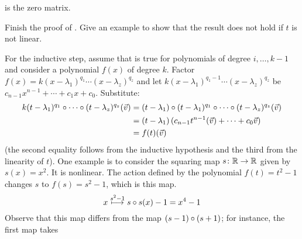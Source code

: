 \begin{exercises}
\begin{answer}
\begin{exparts}
\begin{equation*}
         \end{equation*}
         is the zero matrix.
       \end{exparts} 
     \end{answer}
   \recommended \item \label{exer:PolyMapsFactor}
      \begin{exparts}
        \partsitem Finish the proof of .
        \partsitem Give an example to show that the result does not hold
          if $t$ is not linear.
      \end{exparts}
      \begin{answer}
        \begin{exparts}
          \partsitem
            For the inductive step, assume that 
            is true for polynomials
            of degree \( i,\ldots,k-1 \) and consider a polynomial \( f(x) \)
            of degree \( k \). 
            Factor $f(x)=k(x-\lambda_1)^{q_1}\cdots(x-\lambda_z)^{q_z}$
            and let
            \( k(x-\lambda_1)^{q_1-1}\cdots(x-\lambda_z)^{q_z} \)
            be \( c_{n-1}x^{n-1}+\cdots+c_1x+c_0 \).
            Substitute:
            \begin{align*}
               k(t-\lambda_1)^{q_1}\mathbin{\circ} \cdots\mathbin{\circ} 
                                            (t-\lambda_z)^{q_z}(\vec{v})
               &=
               (t-\lambda_1)\mathbin{\circ} 
                  (t-\lambda_1)^{q_1}\mathbin{\circ} \cdots\mathbin{\circ} 
                  (t-\lambda_z)^{q_z}
                          (\vec{v})    \\
               &=
               (t-\lambda_1)\,(c_{n-1}t^{n-1}(\vec{v})+\cdots+c_0\vec{v}) \\
               &=
               f(t)(\vec{v})
            \end{align*}
           (the second equality follows from the inductive hypothesis and 
           the third from the linearity of \( t \)).
         \partsitem One example is to consider the squaring map
            $\mbox{$s\colon \mathbb{R}\to \mathbb{R}$}$ given by $s(x)=x^2$.
            It is nonlinear.
            The action defined by the polynomial $f(t)=t^2-1$ 
            changes $s$ to $f(s)=s^2-1$, which is this map.
            \begin{equation*} 
              x\stackrel{s^2-1}{\longmapsto} s\mathbin{\circ} s(x)-1=x^4-1
            \end{equation*}
            Observe that this map differs from the map
            $(s-1)\mathbin{\circ} (s+1)$; for instance, the first map takes

\end{exparts}
\end{answer}
\end{exercises}
